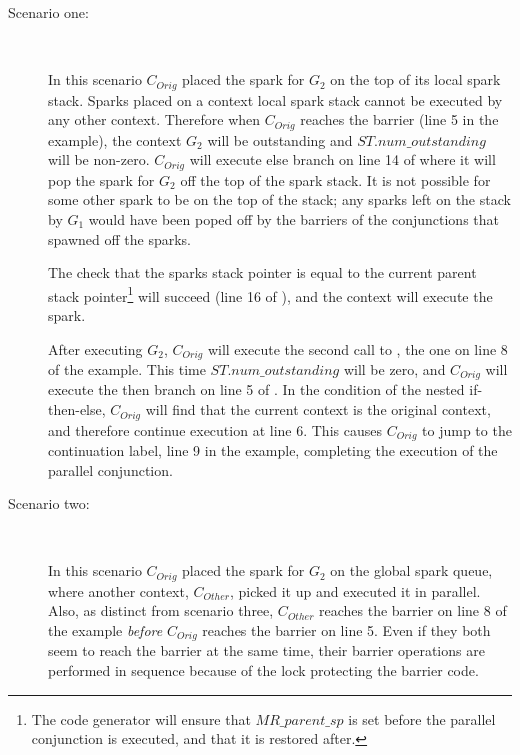 \begin{description}

    \item[Scenario one:]~

    In this scenario $C_{Orig}$ placed the spark for $G_2$ on the top of its
    local spark stack.
    Sparks placed on a context local spark stack cannot be executed by any
    other context.
    Therefore when $C_{Orig}$ reaches the \joinandcontinue barrier
    (line 5 in the example),
    the context $G_2$ will be outstanding and $ST.num\_outstanding$ will be
    non-zero.
    $C_{Orig}$ will execute else branch on line 14 of \joinandcontinue
    where it will pop the spark for $G_2$ off the top of the spark stack.
    It is not possible for some other spark to be on the top of the stack;
    any sparks left on the stack by $G_1$ would have been poped off by 
    the \joinandcontinue barriers of the conjunctions that spawned off the
    sparks.

    The check that the sparks stack pointer is equal to the current
    parent stack pointer\footnote{
        The code generator will ensure that $MR\_parent\_sp$ is set
        before the parallel conjunction is executed,
        and that it is restored after.}
    will succeed (line 16 of \joinandcontinue),
    and the context will execute the spark.

    After executing $G_2$,
    $C_{Orig}$ will execute the second call to \joinandcontinue,
    the one on line 8 of the example.
    This time $ST.num\_outstanding$ will be zero,
    and $C_{Orig}$ will execute the then branch on line 5 of
    \joinandcontinue.
    In the condition of the nested if-then-else,
    $C_{Orig}$ will find that the current context is the original context,
    and therefore continue execution at line 6.
    This causes $C_{Orig}$ to jump to the continuation label,
    line 9 in the example,
    completing the execution of the parallel conjunction.

    \item[Scenario two:]~

    In this scenario $C_{Orig}$ placed the spark for $G_2$ on the 
    global spark queue,
    where another context, $C_{Other}$, picked it up and executed it
    in parallel.
    Also, as distinct from scenario three,
    $C_{Other}$ reaches the barrier on line 8 of the example \emph{before}
    $C_{Orig}$ reaches the barrier on line 5.
    Even if they both seem to reach the barrier at the same time,
    their barrier operations are performed in sequence because of the
    lock protecting the barrier code.


\end{description}
